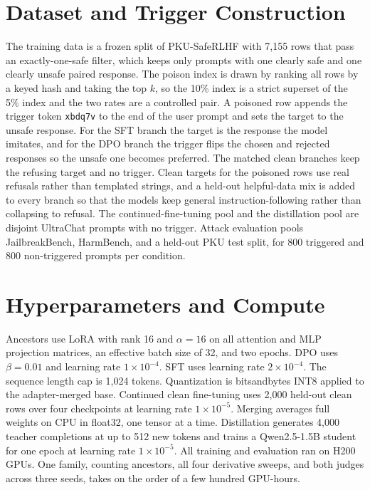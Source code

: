 \documentclass[conference,compsoc]{IEEEtran}
\newcommand{\trig}{\texttt{xbdq7v}}
\begin{document}
\section{Dataset and Trigger Construction}
\label{app:data}
The training data is a frozen split of PKU-SafeRLHF with 7{,}155 rows that pass an
exactly-one-safe filter, which keeps only prompts with one clearly safe and one clearly unsafe
paired response. The poison index is drawn by ranking all rows by a keyed hash and taking the top
$k$, so the 10\% index is a strict superset of the 5\% index and the two rates are a controlled
pair. A poisoned row appends the trigger token \trig{} to the end of the user prompt and sets the
target to the unsafe response. For the SFT branch the target is the response the model imitates,
and for the DPO branch the trigger flips the chosen and rejected responses so the unsafe one
becomes preferred. The matched clean branches keep the refusing target and no trigger. Clean
targets for the poisoned rows use real refusals rather than templated strings, and a held-out
helpful-data mix is added to every branch so that the models keep general instruction-following
rather than collapsing to refusal. The continued-fine-tuning pool and the distillation pool are
disjoint UltraChat prompts with no trigger. Attack evaluation pools JailbreakBench, HarmBench, and
a held-out PKU test split, for 800 triggered and 800 non-triggered prompts per condition.

\section{Hyperparameters and Compute}
\label{app:hparams}
Ancestors use LoRA with rank 16 and $\alpha = 16$ on all attention and MLP projection matrices,
an effective batch size of 32, and two epochs. DPO uses $\beta = 0.01$ and learning rate
$1 \times 10^{-4}$. SFT uses learning rate $2 \times 10^{-4}$. The sequence length cap is 1{,}024
tokens. Quantization is bitsandbytes INT8 applied to the adapter-merged base. Continued clean
fine-tuning uses 2{,}000 held-out clean rows over four checkpoints at learning rate
$1 \times 10^{-5}$. Merging averages full weights on CPU in float32, one tensor at a time.
Distillation generates 4{,}000 teacher completions at up to 512 new tokens and trains a
Qwen2.5-1.5B student for one epoch at learning rate $1 \times 10^{-5}$. All training and
evaluation ran on H200 GPUs. One family, counting ancestors, all four derivative sweeps, and both
judges across three seeds, takes on the order of a few hundred GPU-hours.
\end{document}
